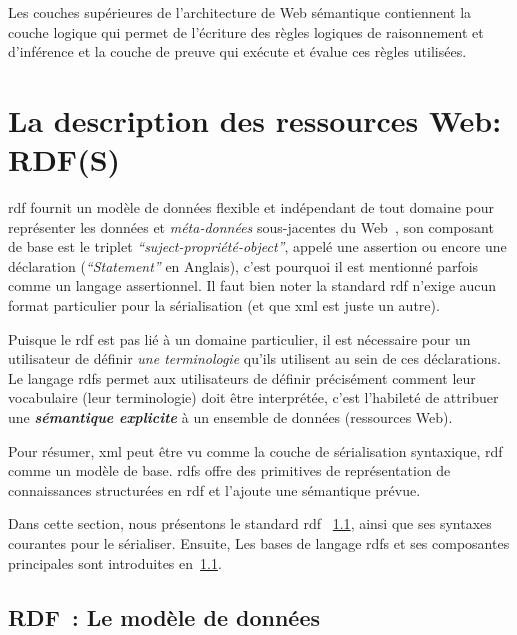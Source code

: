 Les couches supérieures de l'architecture de Web sémantique
contiennent la couche logique qui permet de l'écriture des règles
logiques de raisonnement et d'inférence et la couche de preuve qui
exécute et évalue ces règles utilisées.

\section{La description des ressources Web: RDF(S)}
\label{sec:semantic-web-rdf}

\acrshort{rdf} fournit un modèle de données flexible et indépendant de
tout domaine pour représenter les données et \emph{méta-données}
sous-jacentes du Web~\cite{decker2000semantic}, son composant de base
est le triplet \emph{``suject-propriété-object''}, appelé une assertion
ou encore une déclaration (\emph{``Statement''} en Anglais), c'est
pourquoi il est mentionné parfois comme un langage assertionnel. Il
faut bien noter la standard \acrshort{rdf} n'exige aucun format
particulier pour la sérialisation (et que \acrshort{xml} est juste un
autre).\medskip


\newpage
Puisque le \acrshort{rdf} est pas lié à un domaine particulier, il est
nécessaire pour un utilisateur de définir \emph{une terminologie}
qu'ils utilisent au sein de ces déclarations. Le langage
\acrshort{rdfs} permet aux utilisateurs de définir précisément comment
leur vocabulaire (leur terminologie) doit être interprétée, c'est
l'habileté de attribuer une \emph{\textbf{sémantique explicite}} à un
ensemble de données (ressources Web).\medskip

Pour résumer, \acrshort{xml} peut être vu comme la couche de
sérialisation syntaxique, \acrshort{rdf} comme un modèle de
base. \acrshort{rdfs} offre des primitives de représentation de
connaissances structurées en \acrshort{rdf} et l'ajoute une sémantique
prévue.\medskip

Dans cette section, nous présentons le standard \acrshort{rdf}
~\ref{sec:semantic-web-rdf-rdf}, ainsi que ses syntaxes courantes pour
le sérialiser. Ensuite, Les bases de langage \acrshort{rdfs} et ses
composantes principales sont introduites
en~\ref{sec:semantic-web-rdf-rdf}.\medskip

\subsection{RDF~: Le modèle de données}
\label{sec:semantic-web-rdf-rdf}

